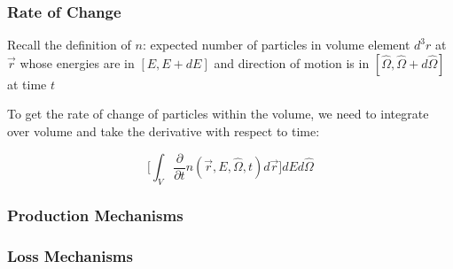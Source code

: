\documentclass[12pt]{article}
\newcommand{\vOmega}{\ensuremath{\hat{\Omega}}}
\begin{document}
\subsubsection{Rate of Change}
Recall the definition of $n$: expected number of particles in volume element $d^3r$ at $\vec{r}$ whose energies are in $[E, E + dE]$ and direction of motion is in $[\vOmega, \vOmega + d\vOmega]$ at time $t$

To get the rate of change of particles within the volume, we need to integrate over volume and take the derivative with respect to time:

\[\Biggl[ \int_V \frac{\partial}{\partial t} n(\vec{r}, E, \vOmega, t) d\vec{r} \Biggr] dE d\vOmega \]


\subsubsection{Production Mechanisms}

\subsubsection{Loss Mechanisms}
\end{document}

